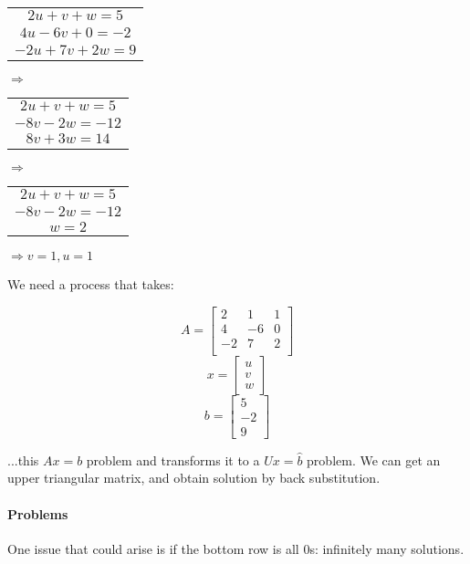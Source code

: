 \begin{tabular}{c}
	$2u + v + w = 5$ \\
	$4u - 6v + 0 = -2$ \\
	$-2u + 7v + 2w = 9$ \\\hline
\end{tabular}

$\Rightarrow$
\begin{tabular}{c}
	$2u + v + w = 5$ \\
	   $-8v - 2w = -12$ \\
         $8v + 3w = 14$ \\\hline
\end{tabular}

$\Rightarrow$
\begin{tabular}{c}
	$2u + v + w = 5$ \\
	   $-8v - 2w = -12$ \\
         $w = 2$ \\\hline
\end{tabular}

$\Rightarrow v = 1, u = 1$

We need a process that takes:

\[
	A = \begin{bmatrix}
		2 & 1 & 1 \\
		4 & -6 & 0 \\
		-2 & 7 & 2 \\
	\end{bmatrix}
\]
\[
	x = \begin{bmatrix}
		u \\ v \\ w
	\end{bmatrix}
\]
\[
	b = \begin{bmatrix}
		5 \\ -2 \\ 9
	\end{bmatrix}
\]

...this $Ax=b$ problem and transforms it to a $Ux = \hat{b}$ problem. We can get an upper triangular matrix, and obtain solution by back substitution.

\paragraph{Problems} One issue that could arise is if the bottom row is all 0s: infinitely many solutions.
